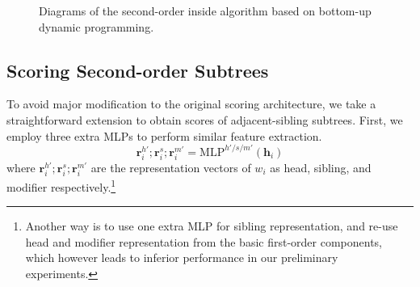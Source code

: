 \documentclass[11pt,a4paper]{article}
\begin{document}
\begin{figure}[tb]
\centering
{}
\caption{Diagrams of the second-order inside algorithm based on bottom-up dynamic programming.}
\label{fig:eisner-2o}
\end{figure}

\subsection{Scoring Second-order Subtrees}
To avoid major modification to the original scoring architecture,
we take a straightforward extension to obtain scores of adjacent-sibling subtrees.
First, we employ three extra MLPs to perform similar feature extraction.
\begin{equation}
\label{mlp-sib}
\mathbf{r}_i^{h'}; \mathbf{r}_i^{s}; \mathbf{r}_i^{m'} =\mathrm{MLP}^{h'/s/m'} \left( \mathbf{h}_i \right)
\end{equation}
where $\mathbf{r}_i^{h'}; \mathbf{r}_i^{s}; \mathbf{r}_i^{m'}$ are the representation vectors of $w_i$ as
head, sibling, and modifier respectively.\footnote{
Another way is to use one extra MLP for sibling representation, and re-use head and modifier representation from the basic first-order components, which however leads to inferior performance
   in our preliminary experiments.
}
\end{document}
